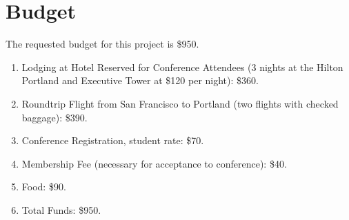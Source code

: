 \documentclass[12pt, oneside]{article}   	%
\begin{document}
\section{Budget} The requested budget for this project is \$950.
\begin{enumerate}
\item Lodging at Hotel Reserved for Conference Attendees (3 nights at the Hilton Portland and Executive Tower at \$120 per night): \$360.
\item Roundtrip Flight from San Francisco to Portland (two flights with checked baggage): \$390.
\item Conference Registration, student rate: \$70.
\item Membership Fee (necessary for acceptance to conference): \$40.
\item Food: \$90.
\item Total Funds: \$950.
\end{enumerate}
\end{document}
